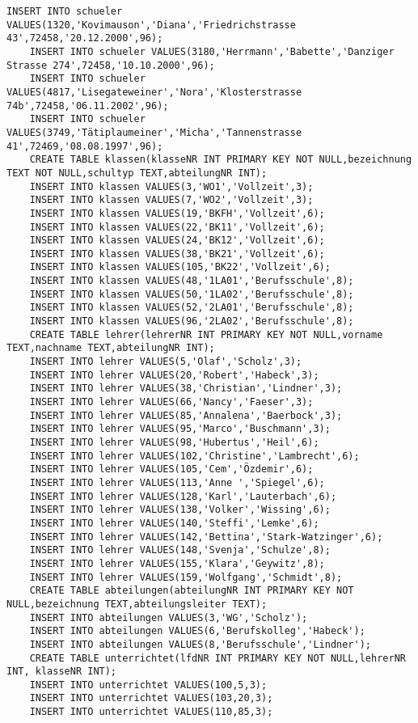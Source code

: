 \begin{lstlisting}[breaklines=True, numbers=none, basicstyle=\tiny, keepspaces=false]
	INSERT INTO schueler VALUES(1320,'Kovimauson','Diana','Friedrichstrasse 43',72458,'20.12.2000',96);
	INSERT INTO schueler VALUES(3180,'Herrmann','Babette','Danziger Strasse 274',72458,'10.10.2000',96);
	INSERT INTO schueler VALUES(4817,'Lisegateweiner','Nora','Klosterstrasse 74b',72458,'06.11.2002',96);
	INSERT INTO schueler VALUES(3749,'Tätiplaumeiner','Micha','Tannenstrasse 41',72469,'08.08.1997',96);
	CREATE TABLE klassen(klasseNR INT PRIMARY KEY NOT NULL,bezeichnung TEXT NOT NULL,schultyp TEXT,abteilungNR INT);
	INSERT INTO klassen VALUES(3,'WO1','Vollzeit',3);
	INSERT INTO klassen VALUES(7,'WO2','Vollzeit',3);
	INSERT INTO klassen VALUES(19,'BKFH','Vollzeit',6);
	INSERT INTO klassen VALUES(22,'BK11','Vollzeit',6);
	INSERT INTO klassen VALUES(24,'BK12','Vollzeit',6);
	INSERT INTO klassen VALUES(38,'BK21','Vollzeit',6);
	INSERT INTO klassen VALUES(105,'BK22','Vollzeit',6);
	INSERT INTO klassen VALUES(48,'1LA01','Berufsschule',8);
	INSERT INTO klassen VALUES(50,'1LA02','Berufsschule',8);
	INSERT INTO klassen VALUES(52,'2LA01','Berufsschule',8);
	INSERT INTO klassen VALUES(96,'2LA02','Berufsschule',8);
	CREATE TABLE lehrer(lehrerNR INT PRIMARY KEY NOT NULL,vorname TEXT,nachname TEXT,abteilungNR INT);
	INSERT INTO lehrer VALUES(5,'Olaf','Scholz',3);
	INSERT INTO lehrer VALUES(20,'Robert','Habeck',3);
	INSERT INTO lehrer VALUES(38,'Christian','Lindner',3);
	INSERT INTO lehrer VALUES(66,'Nancy','Faeser',3);
	INSERT INTO lehrer VALUES(85,'Annalena','Baerbock',3);
	INSERT INTO lehrer VALUES(95,'Marco','Buschmann',3);
	INSERT INTO lehrer VALUES(98,'Hubertus','Heil',6);
	INSERT INTO lehrer VALUES(102,'Christine','Lambrecht',6);
	INSERT INTO lehrer VALUES(105,'Cem','Özdemir',6);
	INSERT INTO lehrer VALUES(113,'Anne ','Spiegel',6);
	INSERT INTO lehrer VALUES(128,'Karl','Lauterbach',6);
	INSERT INTO lehrer VALUES(138,'Volker','Wissing',6);
	INSERT INTO lehrer VALUES(140,'Steffi','Lemke',6);
	INSERT INTO lehrer VALUES(142,'Bettina','Stark-Watzinger',6);
	INSERT INTO lehrer VALUES(148,'Svenja','Schulze',8);
	INSERT INTO lehrer VALUES(155,'Klara','Geywitz',8);
	INSERT INTO lehrer VALUES(159,'Wolfgang','Schmidt',8);
	CREATE TABLE abteilungen(abteilungNR INT PRIMARY KEY NOT NULL,bezeichnung TEXT,abteilungsleiter TEXT);
	INSERT INTO abteilungen VALUES(3,'WG','Scholz');
	INSERT INTO abteilungen VALUES(6,'Berufskolleg','Habeck');
	INSERT INTO abteilungen VALUES(8,'Berufsschule','Lindner');
	CREATE TABLE unterrichtet(lfdNR INT PRIMARY KEY NOT NULL,lehrerNR INT, klasseNR INT);
	INSERT INTO unterrichtet VALUES(100,5,3);
	INSERT INTO unterrichtet VALUES(103,20,3);
	INSERT INTO unterrichtet VALUES(110,85,3);

\end{lstlisting}
